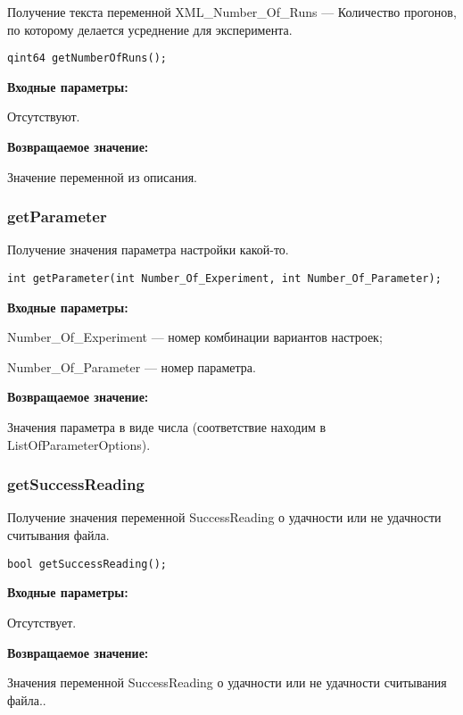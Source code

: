 Получение текста переменной  XML\_Number\_Of\_Runs --- Количество прогонов, по которому делается усреднение для эксперимента.


\begin{lstlisting}[label=code_syntax_getNumberOfRuns,caption=Синтаксис]
qint64 getNumberOfRuns();
\end{lstlisting}

\textbf{Входные параметры:}

Отсутствуют.

\textbf{Возвращаемое значение:}

Значение переменной из описания.


\subsubsection{getParameter}\label{getParameter}

Получение значения параметра настройки какой-то.


\begin{lstlisting}[label=code_syntax_getParameter,caption=Синтаксис]
int getParameter(int Number_Of_Experiment, int Number_Of_Parameter);
\end{lstlisting}

\textbf{Входные параметры:}

Number\_Of\_Experiment --- номер комбинации вариантов настроек;
 
Number\_Of\_Parameter --- номер параметра.

\textbf{Возвращаемое значение:}

Значения параметра в виде числа (соответствие находим в ListOfParameterOptions).


\subsubsection{getSuccessReading}\label{getSuccessReading}

Получение значения переменной SuccessReading о удачности или не удачности считывания файла.


\begin{lstlisting}[label=code_syntax_getSuccessReading,caption=Синтаксис]
bool getSuccessReading();
\end{lstlisting}

\textbf{Входные параметры:}

Отсутствует.

\textbf{Возвращаемое значение:}

Значения переменной SuccessReading о удачности или не удачности считывания файла..


